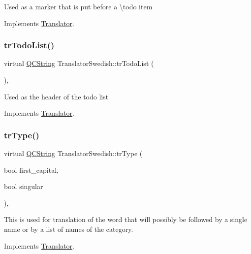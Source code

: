 Used as a marker that is put before a \textbackslash{}todo item 

Implements \mbox{\hyperlink{class_translator}{Translator}}.

\mbox{\label{class_translator_swedish_a3e614aad64da518ccd9453b7bc9eb10c}} 
\subsubsection{\texorpdfstring{trTodoList()}{trTodoList()}}
{\footnotesize\ttfamily virtual \mbox{\hyperlink{class_q_c_string}{Q\+C\+String}} Translator\+Swedish\+::tr\+Todo\+List (\begin{DoxyParamCaption}{ }\end{DoxyParamCaption})\hspace{0.3cm}{\ttfamily [inline]}, {\ttfamily [virtual]}}

Used as the header of the todo list 

Implements \mbox{\hyperlink{class_translator}{Translator}}.

\mbox{\label{class_translator_swedish_a10a94a1f1452e7cff378ae2471f1671d}} 
\subsubsection{\texorpdfstring{trType()}{trType()}}
{\footnotesize\ttfamily virtual \mbox{\hyperlink{class_q_c_string}{Q\+C\+String}} Translator\+Swedish\+::tr\+Type (\begin{DoxyParamCaption}\item[{bool}]{first\+\_\+capital,  }\item[{bool}]{singular }\end{DoxyParamCaption})\hspace{0.3cm}{\ttfamily [inline]}, {\ttfamily [virtual]}}

This is used for translation of the word that will possibly be followed by a single name or by a list of names of the category. 

Implements \mbox{\hyperlink{class_translator}{Translator}}.

\mbox{\label{class_translator_swedish_acd899397b02f8a3dd1125dcaa8966a1d}} 
